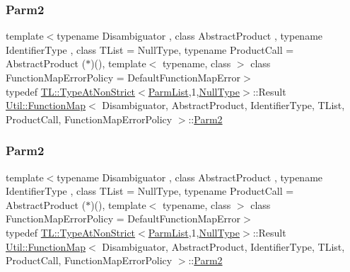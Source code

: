 \subsubsection{\texorpdfstring{Parm2}{Parm2}\hspace{0.1cm}{\footnotesize\ttfamily [1/2]}}
{\footnotesize\ttfamily template$<$typename Disambiguator , class Abstract\+Product , typename Identifier\+Type , class T\+List  = Null\+Type, typename Product\+Call  = Abstract\+Product ($\ast$)(), template$<$ typename, class $>$ class Function\+Map\+Error\+Policy = Default\+Function\+Map\+Error$>$ \\
typedef \mbox{\hyperlink{structUtil_1_1TL_1_1TypeAtNonStrict}{T\+L\+::\+Type\+At\+Non\+Strict}}$<$\mbox{\hyperlink{classUtil_1_1FunctionMap_a6cf0e6766cf6f20642ba61c4994bb477}{Parm\+List}},1,\mbox{\hyperlink{classUtil_1_1NullType}{Null\+Type}}$>$\+::Result \mbox{\hyperlink{classUtil_1_1FunctionMap}{Util\+::\+Function\+Map}}$<$ Disambiguator, Abstract\+Product, Identifier\+Type, T\+List, Product\+Call, Function\+Map\+Error\+Policy $>$\+::\mbox{\hyperlink{classUtil_1_1FunctionMap_a46a76423783c6a8dcc4442ffb8cf54a4}{Parm2}}}

\mbox{\label{classUtil_1_1FunctionMap_a46a76423783c6a8dcc4442ffb8cf54a4}} 
\subsubsection{\texorpdfstring{Parm2}{Parm2}\hspace{0.1cm}{\footnotesize\ttfamily [2/2]}}
{\footnotesize\ttfamily template$<$typename Disambiguator , class Abstract\+Product , typename Identifier\+Type , class T\+List  = Null\+Type, typename Product\+Call  = Abstract\+Product ($\ast$)(), template$<$ typename, class $>$ class Function\+Map\+Error\+Policy = Default\+Function\+Map\+Error$>$ \\
typedef \mbox{\hyperlink{structUtil_1_1TL_1_1TypeAtNonStrict}{T\+L\+::\+Type\+At\+Non\+Strict}}$<$\mbox{\hyperlink{classUtil_1_1FunctionMap_a6cf0e6766cf6f20642ba61c4994bb477}{Parm\+List}},1,\mbox{\hyperlink{classUtil_1_1NullType}{Null\+Type}}$>$\+::Result \mbox{\hyperlink{classUtil_1_1FunctionMap}{Util\+::\+Function\+Map}}$<$ Disambiguator, Abstract\+Product, Identifier\+Type, T\+List, Product\+Call, Function\+Map\+Error\+Policy $>$\+::\mbox{\hyperlink{classUtil_1_1FunctionMap_a46a76423783c6a8dcc4442ffb8cf54a4}{Parm2}}}


